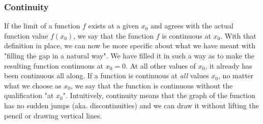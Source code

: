 \subsubsection{Continuity}
If the limit of a function $f$ exists at a given $x_0$ and agrees with the actual function value $f(x_0)$, we say that the function $f$ is continuous at $x_0$. With that definition in place, we can now be more specific about what we have meant with "filling the gap in a natural way". We have filled it in such a way as to make the resulting function continuous at $x_0 = 0$. At all other values of $x_0$, it already has been continuous all along. If a function is continuous at \emph{all} values $x_0$, no matter what we choose as $x_0$, we say that the function is continuous without the qualification "at $x_0$". Intuitively, continuity means that the graph of the function has no sudden jumps (aka. discontinuities) and we can draw it without lifting the pencil or drawing vertical lines.





